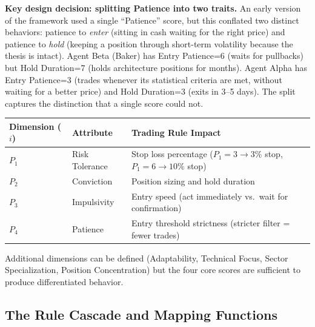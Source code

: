\documentclass[11pt]{article}
\begin{document}
\textbf{Key design decision: splitting Patience into two traits.} An early version of the framework used a single ``Patience'' score, but this conflated two distinct behaviors: patience to \emph{enter} (sitting in cash waiting for the right price) and patience to \emph{hold} (keeping a position through short-term volatility because the thesis is intact). Agent Beta (Baker) has Entry Patience=6 (waits for pullbacks) but Hold Duration=7 (holds architecture positions for months). Agent Alpha has Entry Patience=3 (trades whenever its statistical criteria are met, without waiting for a better price) and Hold Duration=3 (exits in 3--5 days). The split captures the distinction that a single score could not.

{\def\LTcaptype{none} %
{\small
\begin{longtable}{@{}
  >{\raggedright\arraybackslash}p{}
  >{\raggedright\arraybackslash}p{}
  >{\raggedright\arraybackslash}p{}@{}}
\toprule\noalign{}
\begin{minipage}[b]{\linewidth}\raggedright
Dimension (\(i\))
\end{minipage} & \begin{minipage}[b]{\linewidth}\raggedright
Attribute
\end{minipage} & \begin{minipage}[b]{\linewidth}\raggedright
Trading Rule Impact
\end{minipage} \\
\midrule\noalign{}
\endhead
\bottomrule\noalign{}
\endlastfoot
\renewcommand{\arraystretch}{1.15}
\(P_1\) & Risk Tolerance & Stop loss percentage (\(P_1=3 \to 3\%\) stop, \(P_1=6 \to 10\%\) stop) \\
\(P_2\) & Conviction & Position sizing and hold duration \\
\(P_3\) & Impulsivity & Entry speed (act immediately vs.~wait for confirmation) \\
\(P_4\) & Patience & Entry threshold strictness (stricter filter = fewer trades) \\
\end{longtable}}
}

Additional dimensions can be defined (Adaptability, Technical Focus, Sector Specialization, Position Concentration) but the four core scores are sufficient to produce differentiated behavior.

\subsection{The Rule Cascade and Mapping Functions}\label{the-rule-cascade-and-mapping-functions}
\end{document}
